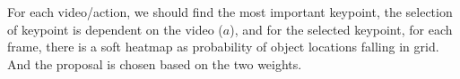 For each video/action, we should find the most important keypoint, the selection of keypoint is dependent on the video ($a$), and for the selected keypoint, for each frame, there is a soft heatmap as probability of object locations falling in grid. And the proposal is chosen based on the two weights.



